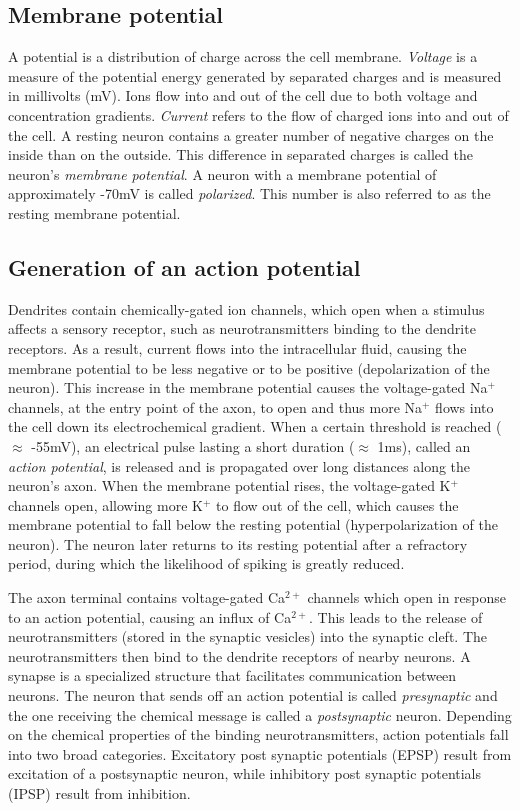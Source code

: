 \subsection{Membrane potential}
A potential is a distribution of charge across the cell membrane.
\textit{Voltage} is a measure of the potential energy generated by separated charges and is measured in millivolts (mV). Ions flow into and out of the cell due to both voltage and concentration gradients. \textit{Current} refers to the flow of charged ions into and out of the cell. A resting neuron contains a greater number of negative charges on the inside than on the outside. 
This difference in separated charges is called the neuron's \textit{membrane potential}. A neuron with a membrane potential of approximately -70mV is called \textit{polarized}. This number is also referred to as the resting membrane potential.  

\subsection{Generation of an action potential}
Dendrites contain chemically-gated ion channels, which open when 
a stimulus affects a sensory receptor, such as neurotransmitters binding to the dendrite receptors. As a result, current flows into the intracellular fluid, causing the membrane potential to be less negative or to be positive (depolarization of the neuron). 
This increase in the membrane potential causes the voltage-gated Na$^{+}$ channels, at the entry point of the axon, to open and thus more Na$^{+}$ flows into the cell down its electrochemical  gradient. When a certain threshold is reached ($\approx$ -55mV), an electrical pulse lasting  a short duration ($\approx$ 1ms),  called an \textit{action potential}, is released and is propagated over long distances along the neuron's axon. When the membrane potential rises, the voltage-gated K$^{+}$ channels open, allowing more K$^{+}$ to flow out of the cell, which causes the membrane potential to fall below the resting potential (hyperpolarization of the neuron). The neuron later returns to its resting potential after a refractory period, during which the likelihood of spiking is greatly reduced.


The axon terminal contains voltage-gated Ca$^{2+}$ channels which open in response to an action potential, causing an influx of Ca$^{2+}$. This leads to the release of neurotransmitters (stored in the synaptic vesicles) into the synaptic cleft. The neurotransmitters then bind to the dendrite receptors of nearby neurons.
A synapse is a specialized structure that facilitates communication between neurons. The neuron that sends off an action potential is called \textit{presynaptic} and the one receiving the chemical message is called a \textit{postsynaptic} neuron. Depending on the chemical properties of the binding neurotransmitters, action potentials fall into two broad categories. Excitatory post synaptic potentials (EPSP) result from excitation of a postsynaptic neuron, while inhibitory post synaptic potentials (IPSP) result from inhibition.

